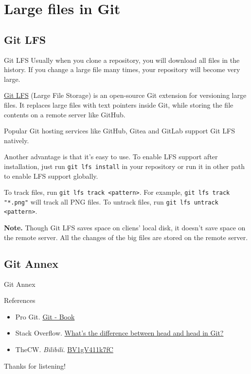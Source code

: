 \documentclass[aspectratio=169]{beamer}
\begin{document}
\section{Large files in Git}

\subsection{Git LFS}

\begin{frame}{Git LFS}
    Usually when you clone a repository, you will download all files in the history. If you change a large file many times, your repository will become very large.

    \pause

    \href{https://git-lfs.com/}{Git LFS} (Large File Storage) is an open-source Git extension for versioning large files. It replaces large files with text pointers inside Git, while storing the file contents on a remote server like GitHub.

    \pause

    Popular Git hosting services like GitHub, Gitea and GitLab support Git LFS natively.

    \pause

    Another advantage is that it's easy to use. To enable LFS support after installation, just run \texttt{git lfs install} in your repository or run it in other path to enable LFS support globally.

    \pause

    To track files, run \texttt{git lfs track <pattern>}. For example, \texttt{git lfs track "*.png"} will track all PNG files. To untrack files, run \texttt{git lfs untrack <pattern>}.

    \pause

    \textbf{Note.} Though Git LFS saves space on cliens' local disk, it doesn't save space on the remote server. All the changes of the big files are stored on the remote server.
\end{frame}

\subsection{Git Annex}

\begin{frame}{Git Annex}

\end{frame}

\begin{frame}{References}
    \begin{itemize}
        \item Pro Git. \href{https://git-scm.com/book/en/v2}{Git - Book}
        \item Stack Overflow. \href{https://stackoverflow.com/questions/2221658/whats-the-difference-between-head-and-head-in-git}{What's the difference between head and head in Git?}
        \item TheCW. \emph{Bilibili}. \href{https://www.bilibili.com/video/BV1gV411k7fC}{BV1gV411k7fC}
    \end{itemize}
\end{frame}

\begin{frame}
    \Huge{\textcolor{UMBlue}{Thanks for listening!}}
\end{frame}
\end{document}
